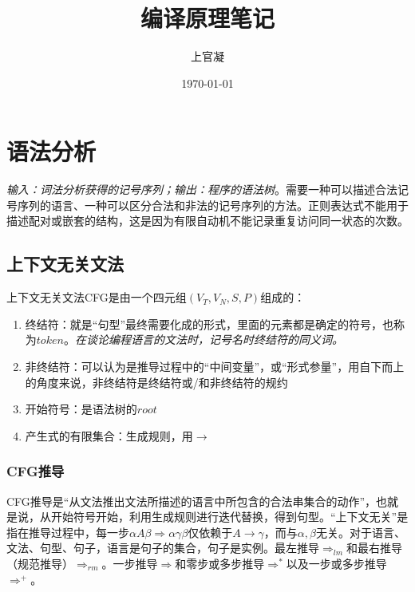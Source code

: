\documentclass[]{report}
\title{{\huge {编译原理笔记}}}
\author{上官凝}
\date{\today}
\begin{document}
\theoremstyle{definition} \newtheorem{theorem}{Thm}[section] %
\theoremstyle{definition} \newtheorem{definition}{Def}[section] %
\theoremstyle{plain} \newtheorem{lemma}{lemma}[section] %

	\maketitle
	\newpage

	\tableofcontents
	\newpage

	\chapter{语法分析}
	\textit{输入：词法分析获得的记号序列；输出：程序的语法树}。需要一种可以描述合法记号序列的语言、一种可以区分合法和非法的记号序列的方法。正则表达式不能用于描述配对或嵌套的结构，这是因为有限自动机不能记录重复访问同一状态的次数。\par
	\section{上下文无关文法}
		上下文无关文法CFG是由一个四元组$(V_T,V_N,S,P)$组成的：
		\begin{enumerate}
			\item 终结符：就是“句型”最终需要化成的形式，里面的元素都是确定的符号，也称为$token$。\textit{在谈论编程语言的文法时，记号名时终结符的同义词。}
			\item 非终结符：可以认为是推导过程中的“中间变量”，或“形式参量”，用自下而上的角度来说，非终结符是终结符或/和非终结符的规约
			\item 开始符号：是语法树的$root$
			\item 产生式的有限集合：生成规则，用$\to$
		\end{enumerate}
		\subsection{CFG推导}
		CFG推导是“从文法推出文法所描述的语言中所包含的合法串集合的动作”，也就是说，从开始符号开始，利用生成规则进行迭代替换，得到句型。“上下文无关”是指在推导过程中，每一步$\alpha A\beta\Rightarrow\alpha\gamma\beta$仅依赖于$A\to\gamma$，而与$\alpha,\beta$无关。对于语言、文法、句型、句子，语言是句子的集合，句子是实例。最左推导$\Rightarrow_{lm}$和最右推导（规范推导）$\Rightarrow_{rm}$。一步推导$\Rightarrow$和零步或多步推导$\Rightarrow^*$以及一步或多步推导$\Rightarrow^+$。\par
\end{document}

